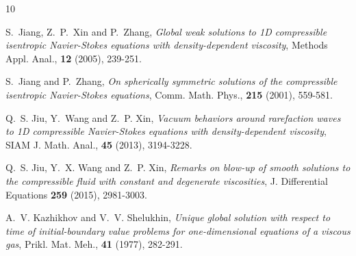\documentclass[11pt, reqno]{amsart}
\numberwithin{equation}{section}
\begin{document}
{\begin{thebibliography}{10}


{\sc S.~Jiang, Z.~P.~Xin and P.~Zhang}, {\em Global weak solutions to 1D compressible isentropic Navier-Stokes equations with density-dependent viscosity}, Methods Appl. Anal., {\bf 12} (2005), 239-251.

{\sc S.~Jiang and P.~Zhang}, {\em On spherically symmetric solutions of the compressible isentropic Navier-Stokes equations}, Comm. Math. Phys., {\bf 215} (2001), 559-581.




{\sc Q.~S. Jiu, Y.~Wang and Z.~P. Xin}, {\em Vacuum behaviors around rarefaction waves to 1D compressible Navier-Stokes equations with density-dependent viscosity}, SIAM J. Math. Anal., {\bf 45} (2013), 3194-3228.


{\sc Q.~S. Jiu, Y.~X. Wang and Z.~P. Xin}, {\em Remarks on blow-up of smooth solutions to the compressible fluid with constant and degenerate viscosities}, J. Differential Equations {\bf 259} (2015), 2981-3003.



	
{\sc A.~V. Kazhikhov and V.~V. Shelukhin}, {\em Unique global solution with respect to time of initial-boundary value problems for one-dimensional equations of a viscous gas}, Prikl. Mat. Meh., {\bf 41} (1977), 282-291.



\end{thebibliography}}
\end{document}
